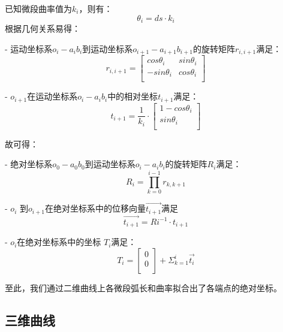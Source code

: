 已知微段曲率值为$k_i$，则有：
\begin{equation}
\theta_i = ds\cdot k_i
\end{equation}
根据几何关系易得：

- 运动坐标系$o_i-a_ib_i$到运动坐标系$o_{i+1}-a_{i+1}b_{i+1}$的旋转矩阵$r_{i, i+1}$满足：
    \begin{equation}
    r_{i, i+1} = \left[
      \begin{matrix}
      cos \theta_i & sin \theta_i\\
      -sin \theta_i & cos \theta_i\\
      \end{matrix}
    \right]
    \end{equation}
    
- $o_{i+1}$在运动坐标系$o_i-a_ib_i$中的相对坐标$t_{i+1}$满足：
    \begin{equation}
    t_{i+1} = \frac{1}{k_i} \cdot \left[
      \begin{matrix}
    	1 - cos\theta_i\\
      sin\theta_i\\
      \end{matrix}
    \right]
    \end{equation}
    

故可得：

- 绝对坐标系$o_0-a_0b_0$到运动坐标系$o_i-a_ib_i$的旋转矩阵$R_i$满足：
    \begin{equation}
    R_i = \prod_{k = 0}^{i-1} r_{k, k+1}
    \end{equation}

- $o_i$ 到$o_{i+1}$在绝对坐标系中的位移向量$\vec{t_{i+1}}$满足
    \begin{equation}
    \vec{t_{i+1}} = Ri^{-1}\cdot t_{i+1}
    \end{equation}
    
- $o_i$在绝对坐标系中的坐标 $T_i$满足：
    \begin{equation}
    T_i = \left[
    		\begin{matrix}
        0\\
        0\\
      	\end{matrix}
      \right]
      + \Sigma_{k=1} ^ {i} \vec{t_i}
    \end{equation}
    
至此，我们通过二维曲线上各微段弧长和曲率拟合出了各端点的绝对坐标。

\subsection{三维曲线}


